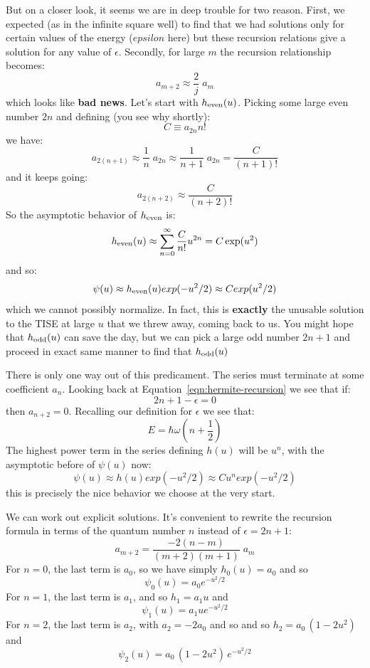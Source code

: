 \documentclass[12pt]{book}
\begin{document}
But on a closer look, it seems we are in deep trouble for two reason.  First, we expected (as in the infinite square well) to find that we had solutions only for certain values of the energy ($epsilon$ here) but these recursion relations give a solution for any value of $\epsilon$.  Secondly, for large $m$ the recursion relationship becomes:
$$a_{m+2} \approx \frac{2}{j}\;a_{m}$$
which looks like {\bf bad news}.  Let's start with $h_{\rm even}(u)$.  Picking some large even number $2n$ and defining (you see why shortly):
$$C \equiv a_{2n} n!$$
we have:
$$a_{2(n+1)} \approx \frac{1}{n}\;a_{2n} \approx \frac{1}{n+1}\;a_{2n} = \frac{C}{(n+1)!}$$
and it keeps going:
$$a_{2(n+2)} \approx \frac{C}{(n+2)!}$$
So the asymptotic behavior of $h_{\rm even}$ is:
$$h_{\rm even}(u) \approx \sum_{n=0}^{\infty} \frac{C}{n!}u^{2n} = C\exp(u^2)$$
and so:
$$\psi(u) \approx h_{\rm even}(u) exp(-u^2/2) \approx C exp(u^2/2)$$
which we cannot possibly normalize.  In fact, this is {\bf exactly} the unusable solution to the TISE at large $u$ that we threw away, coming back to us.
You might hope that $h_{\rm odd}(u)$ can save the day, but we can pick a large odd number $2n+1$ and proceed in exact same manner to find that $h_{\rm odd}(u)$

There is only one way out of this predicament.  The series must terminate at some coefficient $a_n$.
Looking back at Equation~\ref{eqn:hermite-recursion} we see that if:
$$2n+1-\epsilon = 0$$
then $a_{n+2} = 0$.  Recalling our definition for $\epsilon$ we see that:
\begin{equation}
E = \hbar \omega \left( n + \frac{1}{2} \right)
\end{equation}
The highest power term in the series defining $h(u)$ will be $u^n$, with the asymptotic before of $\psi(u)$ now:
$$\psi(u) \approx h(u) exp(-u^2/2) \approx C u^n exp(-u^2/2)$$
this is precisely the nice behavior we choose at the very start.

We can work out explicit solutions.  It's convenient to rewrite the recursion formula in terms of the quantum number $n$ instead of $\epsilon = 2n+1$:
\begin{equation}
a_{m+2} = \frac{-2(n-m)}{(m+2)(m+1)} \; a_m
\end{equation}
For $n=0$, the last term is $a_0$, so we have simply
$h_0(u) = a_0$ and so
$$\psi_0(u) = a_0 e^{-u^2/2}$$
For $n=1$, the last term is $a_1$, and so $h_1=a_1 u$ and
$$\psi_1(u) = a_1 u e^{-u^2/2} $$
For $n=2$, the last term is $a_2$, with $a_2 = -2a_0$ and so
and so $h_2=a_0 \, (1-2u^2)$ and
$$\psi_2(u) =  a_0 \, (1-2u^2) \, e^{-u^2/2} $$
\end{document}
